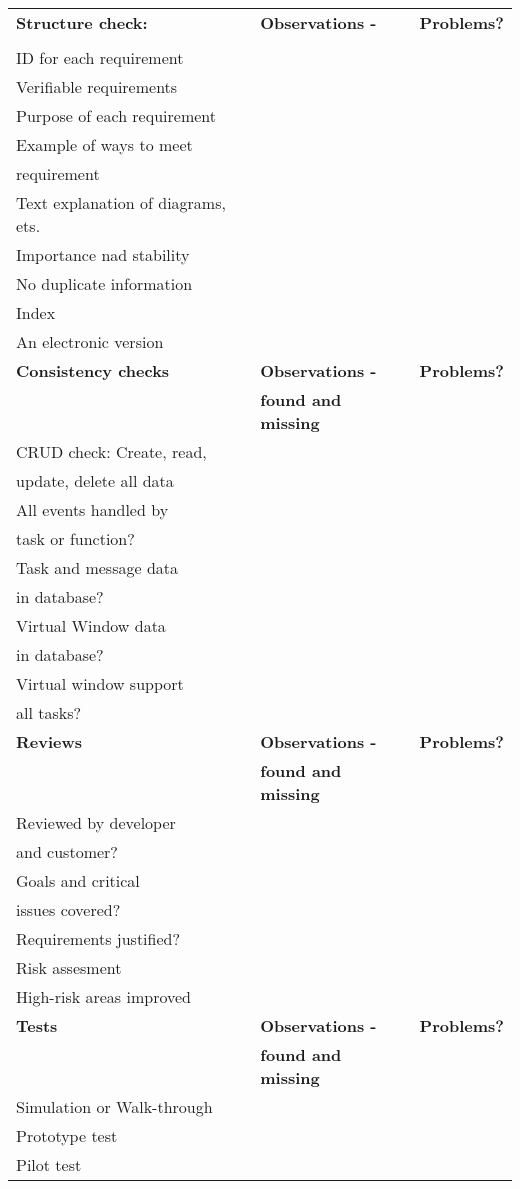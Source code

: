 \documentclass[a4paper]{article}
\begin{document}
	\begin{tabular}{|l|l|l|} \hline
		\textbf{Structure check:} & \textbf{Observations -} & \textbf{Problems?}	\\
			& \text{found and missing}	&	\\ \hline
		ID for each requirement	&	&	\\ \hline
		Verifiable requirements	&	&	\\ \hline
		Purpose of each requirement	&	&	\\ \hline
		Example of ways to meet	&	&	\\
		requirement	&	&	\\ \hline
		Text explanation of diagrams, ets.	&	&	\\ \hline
		Importance nad stability	&	&	\\ \hline
		No duplicate information	&	&	\\ \hline
		Index	&	&	\\ \hline
		An electronic version	&	&	\\ \hline
		\textbf{Consistency checks}	& \textbf{Observations -} & \textbf{Problems?} \\
			& \textbf{found and missing}	&	\\ \hline
		CRUD check: Create, read, &	&	\\
		update, delete all data	&	&	\\ \hline
		All events handled by	&	&	\\ 
		task or function?	&	&	\\ \hline
		Task and message data	&	&	\\
		in database?	&	&	\\ \hline
		Virtual Window data	&	&	\\
		in database?	&	&	\\ \hline
		Virtual window support	&	&	\\
		all tasks?	&	&	\\ \hline
		\textbf{Reviews}     & \textbf{Observations -} & \textbf{Problems?} \\
                        & \textbf{found and missing}    &       \\ \hline
		Reviewed by developer	&	&	\\
		and customer?	&	&	\\ \hline
		Goals and critical	&	&	\\
		issues covered?	&	&	\\ \hline
		Requirements justified?	&	&	\\ \hline
		Risk assesment	&	&	\\ \hline
		High-risk areas improved	&	&	\\ \hline
		\textbf{Tests}     & \textbf{Observations -} & \textbf{Problems?} \\
                        & \textbf{found and missing}    &       \\ \hline
		Simulation or Walk-through	&	&	\\ \hline
		Prototype test	&	&	\\ \hline
		Pilot test	&	&	\\ \hline
	\end{tabular}
\end{document}
